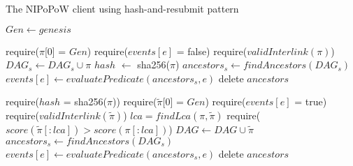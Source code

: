 \begin{algorithm}
    \label{alg:har-nipopow}
    \caption{The \textsf{NIPoPoW} client using hash-and-resubmit pattern}
    \begin{algorithmic}[1]
            \State $Gen \gets genesis$
        \EndFunction
    \vskip8pt
    \end{algorithmic}

    \begin{algorithmic}[1]
        \State require($\pi$[0] = $Gen$)
        \State require($events[e]$ = false)
        \State require($validInterlink(\pi)$)
        \State $DAG_s \gets DAG_s \cup \pi$
        \State $hash$ $\gets$ sha256($\pi$)
        \State $ancestors_s \gets findAncestors(DAG_s)$
        \State $events[e] \gets evaluatePredicate(ancestors_s, e)$
        \State delete $ancestors$
    \EndFunction
    \vskip8pt
    \end{algorithmic}

    \begin{algorithmic}[1]
        \State require($hash$ = sha256($\pi$))
        \State require($\tilde\pi$[0] = $Gen$)
        \State require($events[e]$ = true)
        \State require($validInterlink(\tilde\pi)$)
        \State $lca = findLca(\pi, \tilde\pi)$
        \State require($score(\tilde\pi[:lca]) > score(\pi[:lca])$)
        \State $DAG \gets DAG \cup \tilde\pi$
        \State $ancestors_s \gets findAncestors(DAG_s)$
        \State $events[e] \gets evaluatePredicate(ancestors_s, e)$
        \State delete $ancestors$
    \EndFunction
    \vskip8pt
    \end{algorithmic}
\end{algorithm}

